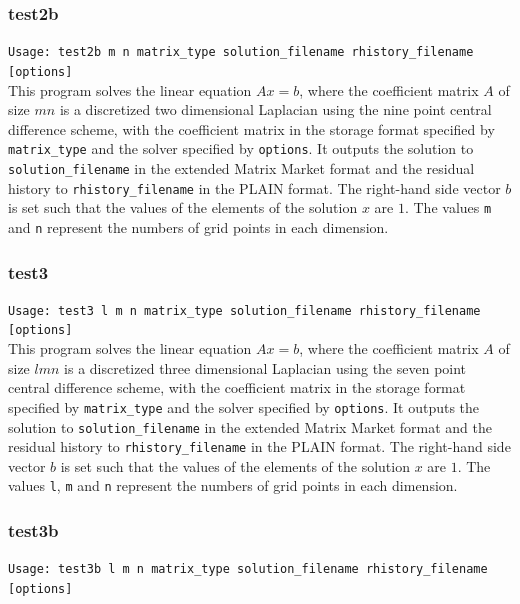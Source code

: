 \documentclass[a4paper]{article}
\begin{document}
\subsubsection{test2b}

\verb+Usage: test2b m n matrix_type solution_filename rhistory_filename [options]+\\

This program solves the linear equation $Ax = b$, where the coefficient 
matrix $A$ of size $mn$ is a discretized two dimensional 
Laplacian using the nine 
point central difference scheme, with the coefficient matrix 
in the storage format specified
by \verb|matrix_type| and the solver specified by {\tt options}. 
It outputs the solution to {\tt solution\_filename} in the extended 
Matrix Market format and 
the residual history to {\tt rhistory\_filename} in the PLAIN format. 
The right-hand side vector $b$ is set such that the values of the elements
of the solution $x$ are $1$. 
The values {\tt m} and  {\tt n} represent the numbers of grid points
in each dimension. 

\subsubsection{test3}

\verb+Usage: test3 l m n matrix_type solution_filename rhistory_filename [options]+\\

This program solves the linear equation $Ax = b$, where the coefficient 
matrix $A$ of size $lmn$ is a discretized three dimensional 
Laplacian using the seven
point central difference scheme, with the coefficient matrix 
in the storage format specified
by \verb|matrix_type| and the solver specified by {\tt options}. 
It outputs the solution to {\tt solution\_filename} in the extended 
Matrix Market format and 
the residual history to {\tt rhistory\_filename} in the PLAIN format. 
The right-hand side vector $b$ is set such that the values of the elements of the solution $x$ are $1$. 
The values {\tt l}, {\tt m} and {\tt n} represent the numbers of grid
points in each dimension. 

\subsubsection{test3b}

\verb+Usage: test3b l m n matrix_type solution_filename rhistory_filename [options]+\\
\end{document}
